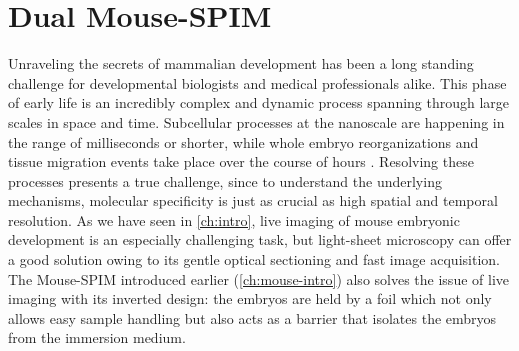 

\chapter{Dual Mouse-SPIM}

\graphicspath{{./figures/2_DualMouse/}}

\label{ch:DualMouse}




Unraveling the secrets of mammalian development has been a long standing challenge for developmental biologists and medical professionals alike. 
This phase of early life is an incredibly complex and dynamic process spanning through large scales in space and time. Subcellular processes at the nanoscale are happening in the range of milliseconds or shorter, while whole embryo reorganizations and tissue migration events take place over the course of hours \cite{gilbert_developmental_2013}. Resolving these processes presents a true challenge, since to understand the underlying mechanisms, molecular specificity is just as crucial as high spatial and temporal resolution.
As we have seen in \autoref{ch:intro}, live imaging of mouse embryonic development is an especially challenging task, but light-sheet microscopy can offer a good solution owing to its gentle optical sectioning and fast image acquisition. The Mouse-SPIM \cite{strnad_inverted_2016} introduced earlier (\autoref{ch:mouse-intro}) also solves the issue of live imaging with its inverted design: the embryos are held by a foil which not only allows easy sample handling but also acts as a barrier that isolates the embryos from the immersion medium.

